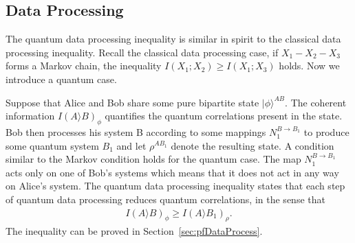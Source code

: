 \subsection{Data Processing}
The quantum data processing inequality is similar in spirit to the classical data processing inequality.
Recall the classical data processing case, if $X_1-X_2-X_3$ forms a Markov chain, the inequality $I(X_1;X_2) \geq I(X_1;X_3)$ holds.
Now we introduce a quantum case.

Suppose that Alice and Bob share some pure bipartite state $|\phi \rangle ^{AB}$.
The coherent information $I(A\rangle B)_{\phi}$ quantifies the quantum correlations present in the state.
Bob then processes his system B according to some mappings $N_1^{B\to B_1}$ to produce some quantum system $B_1$ and let $\rho ^{AB_1}$ denote the resulting state.
A condition similar to the Markov condition holds for the quantum case.
The map $N_1^{B\to B_1}$ acts only on one of Bob's systems which means that it does not act in any way on Alice's system.
The quantum data processing inequality states that each step of quantum data processing reduces quantum correlations, in the sense that
\begin{align}
I(A \rangle B)_{\phi} \geq I(A \rangle B_1)_{\rho}.
\end{align}
The inequality can be proved in Section~\ref{sec:pfDataProcess}.